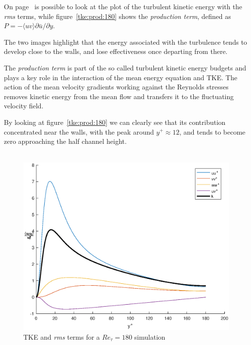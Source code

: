 On page~\pageref{k+budgets:180} is possible to look at the plot of the turbulent kinetic energy with the \emph{rms} terms, while figure~\ref{tke:prod:180} shows the \emph{production term}, defined as $P=-\langle uv\rangle \partial{\bar{u}}/\partial{y}$.\par
The two images highlight that the energy associated with the turbulence tends to develop close to the walls, and lose effectiveness once departing from there.\par
The \emph{production term} is part of the so called turbulent kinetic energy budgets and plays a key role in the interaction of the mean energy equation and TKE. The action of the mean velocity gradients working against the Reynolds stresses removes kinetic energy from the mean flow and transfers it to the fluctuating velocity field. \par
By looking at figure~\ref{tke:prod:180} we can clearly see that its contribution concentrated near the walls, with the peak around $y^{+} \approx 12$, and tends to become zero approaching the half channel height. \\~\par

\begin{figure}
\begin{center}
\includegraphics[scale=0.55]{grafici/budget+k_180.eps}
\caption{TKE and \emph{rms} terms for a $Re_{\tau}=180$ simulation}
\label{k+budgets:180}
\end{center} 
\end{figure}

